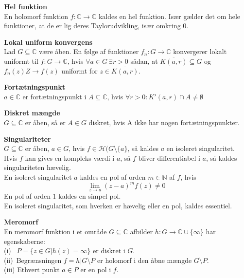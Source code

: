 \documentclass[10pt,a4paper]{article}
\theoremstyle{definition}
\begin{document}
\begin{framed}
\textbf{Hel funktion } \\
En holomorf funktion $f: \mathbb{C} \rightarrow \mathbb{C}$ kaldes en hel funktion. Især gælder det om hele funktioner, at de er lig deres Taylorudvikling, især omkring $0$.
\end{framed}

\newpage
\begin{framed}
\textbf{Lokal uniform konvergens} \\
Lad $G \subseteq \mathbb{C}$ være åben. En følge af funktioner $f_n : G \rightarrow \mathbb{C}$ konvergerer lokalt uniformt til $f: G \rightarrow \mathbb{C}$, hvis $\forall a \in G \ \exists r>0$ sådan, at $\overline{K(a,r)} \subseteq G$ og $f_n(z) Z\rightarrow f(z)$ uniformt for $z \in \overline{K(a,r)}$.
\end{framed}

\begin{framed}
\textbf{Fortætningspunkt} \\
$a \in \mathbb{C}$ er fortætningspunkt i $A \subseteq \mathbb{C}$, hvis  $\forall r >0 : K'(a,r) \cap A \neq \emptyset$
\end{framed}

\begin{framed}
\textbf{Diskret mængde} \\
$G \subseteq \mathbb{C}$ er åben, så er $A \in G$ diskret, hvis A ikke har nogen fortætningspunkter.
\end{framed}

\begin{framed}
\textbf{Singulariteter} \\
$G \subseteq \mathbb{C}$ er åben, $a \in G$, hvis $f \in \mathcal{H}(G \setminus \{a\}$, så kaldes $a$ en isoleret singularitet. \\
Hvis $f$ kan gives en kompleks værdi i $a$, så $f$ bliver differentiabel i $a$, så kaldes singulariteten hævelig. \\
En isoleret singularitet $a$ kaldes en pol af orden $m \in \mathbb{N}$ af $f$, hvis
$$\lim_{z \rightarrow a}(z-a)^m f(z) \neq 0$$
En pol af orden $1$ kaldes en simpel pol. \\
En isoleret singularitet, som hverken er hævelig eller en pol, kaldes essentiel.
\end{framed}

\begin{framed}
\textbf{Meromorf} \\
En meromorf funktion i et område $G \subseteq \mathbb{C}$ afbilder $h : G \rightarrow \mathbb{C} \cup \{\infty\}$ har egenskaberne: \\
(i) \ $P = \{z \in G | h(z) = \infty\}$ er diskret i $G$. \\
(ii)\ Begrænsningen $f = h|G \setminus P$ er holomorf i den åbne mængde $G \setminus P$. \\
(iii) Ethvert punkt $a \in P$ er en pol i $f$.
\end{framed}
\end{document}
